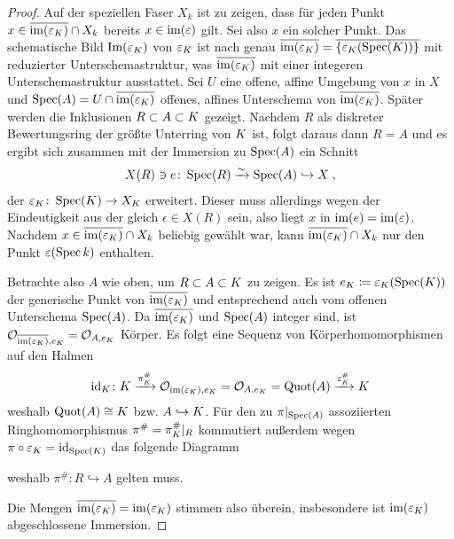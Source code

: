 \begin{Lemma}
\begin{proof}
    Auf der speziellen Faser $X_k$ ist zu zeigen, dass für jeden
    Punkt $x\in\overline{\operatorname{im}(\varepsilon_{K})}\cap X_k$ bereits
    $x\in\operatorname{im}(\varepsilon)$ gilt. Sei also $x$ ein solcher Punkt.
    Das schematische Bild $\text{Im}(\varepsilon_{K})$ von $\varepsilon_{K}$ ist
    nach \cite[Remark 10.32]{wedhorn} genau
    $\overline{\operatorname{im}(\varepsilon_{K})}=\overline{\{\varepsilon_{K}(\operatorname{Spec}(K))\}}$
    mit reduzierter Unterschemastruktur, was
    $\overline{\operatorname{im}(\varepsilon_{K})}$ mit einer integeren
    Unterschemastruktur ausstattet.
    Sei $U$ eine offene, affine Umgebung von $x$ in $X$ und
    $\operatorname{Spec}(A)=U\cap\overline{\operatorname{im}(\varepsilon_{K})}$ offenes, affines
    Unterschema von $\overline{\operatorname{im}(\varepsilon_{K})}$.
    Später werden die Inklusionen $R\subset A\subset K$ gezeigt.
    Nachdem $R$ als diskreter Bewertungsring der größte Unterring
    von $K$ ist, folgt daraus dann $R=A$ und es ergibt sich zusammen
    mit der Immersion zu $\operatorname{Spec}(A)$ ein Schnitt
    \begin{gather*}
      X(R)\ni e\colon
      \operatorname{Spec}(R)\xrightarrow{\sim}\operatorname{Spec}(A)\hookrightarrow X\;,
    \end{gather*}
    der $\varepsilon_{K}\colon\operatorname{Spec}(K)\to X_{K}$ erweitert.
    Dieser muss allerdings wegen der Eindeutigkeit aus der \NAbbEig
    gleich $\epsilon\in X(R)$ sein, also liegt $x$ in
    $\operatorname{im}(e)=\operatorname{im}(\varepsilon)$.
    Nachdem $x\in \overline{\operatorname{im}(\varepsilon_{K})}\cap X_k$ beliebig
    gewählt war, kann $\overline{\operatorname{im}(\varepsilon_{K})}\cap X_k$ nur
    den Punkt $\varepsilon(\operatorname{Spec} k)$ enthalten.

    Betrachte also $A$ wie oben, um $R\subset A\subset K$ zu
    zeigen. Es ist $e_{K}\coloneqq\varepsilon_{K}(\operatorname{Spec}(K))$ der
    generische Punkt von $\overline{\operatorname{im}(\varepsilon_{K})}$ und
    entsprechend auch vom offenen Unterschema $\operatorname{Spec}(A)$. Da
    $\overline{\operatorname{im}(\varepsilon_{K})}$ und $\operatorname{Spec}(A)$ integer sind, ist
    $\mathcal{O}_{\overline{\text{im}(\varepsilon_{K})}, e_{K}}=\mathcal{O}_{A,e_{K}}$ Körper.
    Es folgt eine Sequenz von Körperhomomorphismen auf den Halmen
    \begin{gather*}
      \mathrm{id}_{K}\colon
      K \xrightarrow{\pi_{K}^\#}
      \mathcal{O}_{\text{im}(\varepsilon_{K}), e_{K}} = \mathcal{O}_{A,e_{K}} = \operatorname{Quot}(A)
      \xrightarrow{\varepsilon_{K}^\#} K
    \end{gather*}
    weshalb $\operatorname{Quot}(A)\cong K$ bzw. $A\hookrightarrow K$.
    Für den zu $\pi|_{\operatorname{Spec}(A)}$ assoziierten
    Ringhomomorphismus $\pi^\#=\pi_{K}^\#|_R$ kommutiert außerdem wegen
    $\pi\circ\varepsilon_{K}=\mathrm{id}_{\operatorname{Spec}(K)}$ das folgende Diagramm
    \begin{center}
    \end{center}
    weshalb $\pi^\#\colon R\hookrightarrow A$ gelten muss.
    
    Die Mengen $\overline{\operatorname{im}(\varepsilon_{K})}=\operatorname{im}(\varepsilon_{K})$ stimmen
    also überein, insbesondere ist $\operatorname{im}(\varepsilon_{K})$ abgeschlossene
    Immersion.
  \end{proof}
\end{Lemma}


